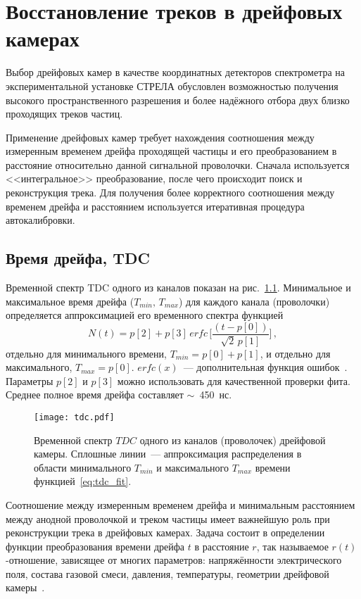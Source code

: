 \chapter{Восстановление треков в дрейфовых камерах}
Выбор дрейфовых камер в качестве координатных детекторов спектрометра на
экспериментальной установке СТРЕЛА обусловлен возможностью получения высокого
пространственного разрешения и более надёжного отбора двух близко проходящих
треков частиц.

Применение дрейфовых камер требует нахождения соотношения между измеренным
временем дрейфа проходящей частицы и его преобразованием в расстояние
относительно данной сигнальной проволочки. Сначала используется <<интегральное>>
преобразование, после чего происходит поиск и реконструкция трека. Для получения
более корректного соотношения между временем дрейфа и расстоянием используется
итеративная процедура автокалибровки.

\section{Время дрейфа, TDC}
Временной спектр TDC одного из каналов показан на рис.~\ref{fig:tdc}.
Минимальное и максимальное время дрейфа ($T_{min},\,T_{max}$) для каждого канала
(проволочки) определяется аппроксимацией его временного спектра функцией
\begin{equation}
  \label{eq:tdc_fit}
  N(t) = p[2] + p[3]\,erfc\,\Biggl[\frac{(t - p[0])}{\sqrt{2}\,p[1]} \Biggr]\,,
\end{equation}
отдельно для минимального времени, $T_{min} = p[0] + p[1]$, и отдельно для
максимального, $T_{max} = p[0]$. $erfc(x)$~--- дополнительная функция
ошибок~\cite{erfc_web}. Параметры $p[2]$ и $p[3]$ можно использовать для
качественной проверки фита. Среднее полное время дрейфа составляет
$\sim$~450~нс.

\begin{figure}[h]
  \centering
  \texttt{[image: tdc.pdf]}
  \caption{Временной спектр $TDC$ одного из каналов (проволочек) дрейфовой
    камеры. Сплошные линии~--- аппроксимация распределения в области
    минимального $T_{min}$ и максимального $T_{max}$ времени
    функцией~\eqref{eq:tdc_fit}.}
  \label{fig:tdc}
\end{figure}

Соотношение между измеренным временем дрейфа и минимальным расстоянием между
анодной проволочкой и треком частицы имеет важнейшую роль при реконструкции
трека в дрейфовых камерах. Задача состоит в определении функции преобразования
времени дрейфа $t$ в расстояние $r$, так называемое $r(t)$-отношение, зависящее
от многих параметров: напряжённости электрического поля, состава газовой смеси,
давления, температуры, геометрии дрейфовой камеры~\cite{pesehonov86}.

